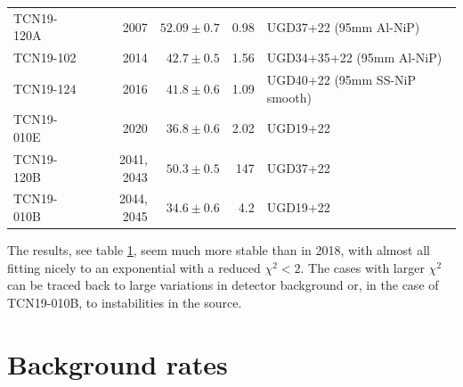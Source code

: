 \documentclass[10pt,letterpaper]{article}
\begin{document}
\begin{table}
\begin{tabular}{l r r r l}
TCN19-120A & 2007 & $52.09 \pm 0.7$ & 0.98 & UGD37+22 (95mm Al-NiP) \\
TCN19-102 & 2014 & $42.7 \pm 0.5$ & 1.56 & UGD34+35+22 (95mm Al-NiP) \\
TCN19-124 & 2016 & $41.8 \pm 0.6$ & 1.09 & UGD40+22 (95mm SS-NiP smooth) \\
TCN19-010E & 2020 & $36.8 \pm 0.6$ & 2.02 & UGD19+22 \\
TCN19-120B & 2041, 2043 & \sout{$50.3 \pm 0.5$} & 147 & UGD37+22 \\
TCN19-010B & 2044, 2045 & \sout{$34.6 \pm 0.6$} & 4.2 & UGD19+22 \\
\bottomrule
\end{tabular}
\label{tab:storagelifetime_with_monitor}
\end{table}

The results, see table \ref{tab:storagelifetime_with_monitor}, seem much more stable than in 2018, with almost all fitting nicely to an exponential with a reduced $\chi^2 < 2$. The cases with larger $\chi^2$ can be traced back to large variations in detector background or, in the case of TCN19-010B, to instabilities in the source.

\section{Background rates}
\label{sec:background}
\end{document}
